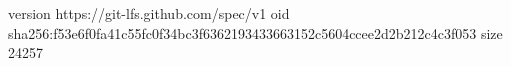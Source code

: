 version https://git-lfs.github.com/spec/v1
oid sha256:f53e6f0fa41c55fc0f34bc3f6362193433663152c5604ccee2d2b212c4c3f053
size 24257
